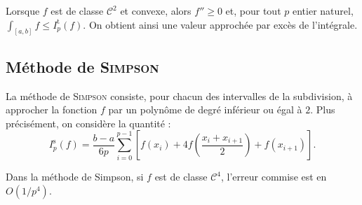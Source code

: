 \begin{remarque}
Lorsque $f$ est de classe $\mathscr{C}^2$ et convexe, alors $f'' \geq 0$ et, pour tout $p$ entier naturel, \mbox{$\int_{[a,b]} f \leq I_p^\mathrm{t}(f)$}. On obtient ainsi une valeur approchée par excès de l'intégrale.
\end{remarque}

\subsection{Méthode de \textsc{Simpson}}

La méthode de \textsc{Simpson} consiste, pour chacun des intervalles de la subdivision, à approcher la fonction $f$ par un polynôme de degré inférieur ou égal à $2$. Plus précisément, on considère la quantité :
\[
I_p^\mathrm{s}(f) = \frac{b-a}{6 p} \sum_{i=0}^{p-1} \left[f(x_i)+ 4 f\left(\frac{x_i + x_{i+1}}{2}\right) + f(x_{i+1})\right].
\]

\begin{prop}{}{}
Dans la méthode de Simpson, si $f$ est de classe $\mathscr{C}^4$, l'erreur commise est en $O(1/p^4)$.
\end{prop}

